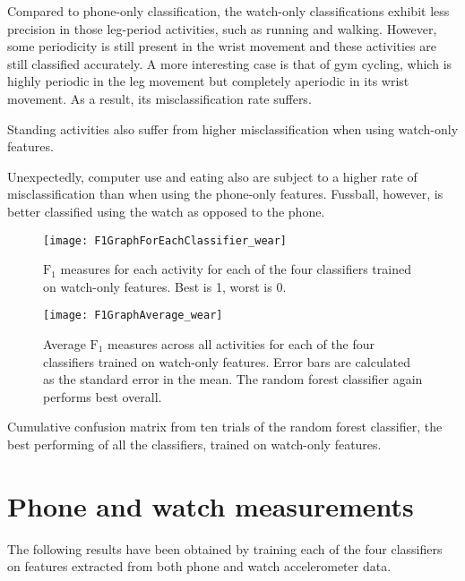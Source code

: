     Compared to phone-only classification, the watch-only classifications exhibit less precision in those leg-period activities, such as running and walking. However, some periodicity is still present in the wrist movement and these activities are still classified accurately. A more interesting case is that of gym cycling, which is highly periodic in the leg movement but completely aperiodic in its wrist movement. As a result, its misclassification rate suffers.
    
    Standing activities also suffer from higher misclassification when using watch-only features.
    
    Unexpectedly, computer use and eating also are subject to a higher rate of misclassification than when using the phone-only features. Fussball, however, is better classified using the watch as opposed to the phone.

    \begin{figure}
      \centering
      \texttt{[image: F1GraphForEachClassifier\_wear]}
      \caption{$\mathrm{F}_1$ measures for each activity for each of the four classifiers trained on watch-only features. Best is 1, worst is 0.}
      \label{fig:F1GraphForEachClassifier_wear}
    \end{figure}

    \begin{figure}
      \centering
      \texttt{[image: F1GraphAverage\_wear]}
      \caption[Average $\mathrm{F}_1$ measures across all activities for each of the four classifiers trained on watch-only features]{Average $\mathrm{F}_1$ measures across all activities for each of the four classifiers trained on watch-only features. Error bars are calculated as the standard error in the mean. The random forest classifier again performs best overall.}
      \label{fig:F1GraphAverage_wear}
    \end{figure}
    
    \begin{table}
      \tabcolsep=0.11cm
      \centering
        
      \caption[Confusion matrix of the random forest classifier trained on watch-only features]{Cumulative confusion matrix from ten trials of the random forest classifier, the best performing of all the classifiers, trained on watch-only features.}
      \label{tab:ConfusionMatrix_wear_RandomForestClassifier}
    \end{table}
    
  
  \section{Phone and watch measurements}
    The following results have been obtained by training each of the four classifiers on features extracted from both phone and watch accelerometer data.
    
